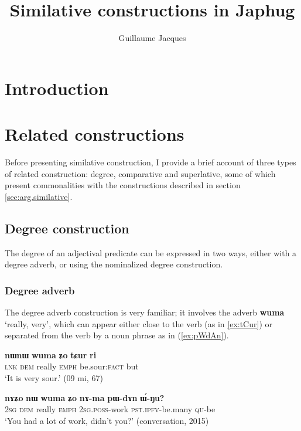 \documentclass[oneside,a4paper,11pt]{article}
\newcommand{\ipa}[1]{{\phon\textbf{#1}}} %
\newcommand{\forme}[2]{\ipa{#1} `#2'}
\begin{document}
 

\title{Similative constructions in Japhug}
\author{Guillaume Jacques}
\maketitle
\linenumbers

\section*{Introduction}

\section{Related constructions}
Before presenting similative construction, I provide a brief account of three types of related construction: degree, comparative and superlative, some of which present commonalities with the constructions described in section \ref{sec:arg.similative}.

\subsection{Degree construction}
The degree of an adjectival predicate can be expressed in two ways, either with a degree adverb, or using the nominalized degree construction.

\subsubsection{Degree adverb} \label{sec:wuma}
The degree adverb construction is very familiar; it involves the adverb \forme{wuma}{really, very}, which can appear either close to the verb (as in \ref{ex:tCur}) or separated from the verb by a noun phrase as in (\ref{ex:pWdAn}).

\begin{exe}
\ex \label{ex:tCur}
\gll \ipa{tɕe} 	\ipa{nɯnɯ} 	\ipa{wuma} 	\ipa{ʑo} 	\ipa{tɕur} 	\ipa{ri} \\
\textsc{lnk} \textsc{dem} really  \textsc{emph} be.sour:\textsc{fact} but \\
\glt `It is very sour.' (09 mi, 67)
\end{exe}

\begin{exe}
\ex \label{ex:pWdAn}
\gll
\ipa{nɤʑo} 	\ipa{nɯ} 	\ipa{wuma} 	\ipa{ʑo} 	\ipa{nɤ-ma} 	\ipa{pɯ-dɤn} 	\ipa{ɯ́-ŋu?}  \\
\textsc{2sg} \textsc{dem} really \textsc{emph} \textsc{2sg.poss}-work \textsc{pst.ipfv}-be.many \textsc{qu}-be \\
\glt `You had a lot of work, didn't you?' (conversation, 2015)
\end{exe}
\end{document}
